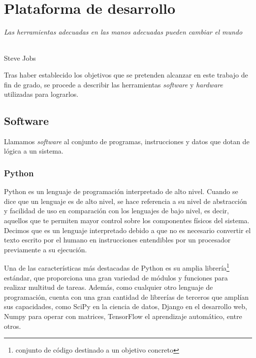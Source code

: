 \chapter{Plataforma de desarrollo}
\label{cap:capitulo4}

\begin{flushright}
\begin{minipage}[]{10cm}
\emph{Las herramientas adecuadas en las manos adecuadas pueden cambiar el mundo}\\
\end{minipage}\\
Steve Jobs\\
\end{flushright}

\vspace{1cm}
Tras haber establecido los objetivos que se pretenden alcanzar en este trabajo de fin de grado, se procede a describir
las herramientas \textit{software} y \textit{hardware} utilizadas para lograrlos. 

\section{Software}
\label{sec:software}
Llamamos \textit{software} al conjunto de programas, instrucciones y datos que dotan de lógica a un sistema.
\subsection{Python}
\label{subsec:pyhton}
\noindent Python es un lenguaje de programación interpretado de alto nivel. Cuando se dice que un lenguaje es de alto nivel, se hace referencia a su nivel de 
abstracción y facilidad de uso en comparación con los lenguajes de bajo nivel, es decir, aquellos que te permiten mayor control sobre los 
componentes físicos del sistema. Decimos que es un lenguaje interpretado debido a que no es necesario convertir el texto escrito por el humano en 
instrucciones entendibles por un procesador previamente a su ejecución.  

Una de las características más destacadas de Python es su amplia librería\footnote{conjunto de código destinado a un objetivo concreto} estándar, que proporciona 
una gran variedad de módulos y funciones para realizar multitud de tareas. Además, como cualquier otro lenguaje de programación, cuenta con una gran cantidad de librerías de terceros que 
amplían sus capacidades, como SciPy en la ciencia de datos, Django en el desarrollo web, Numpy para operar con matrices, TensorFlow el aprendizaje automático, entre otros.

